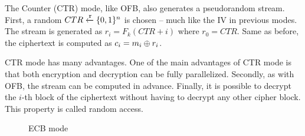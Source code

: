 \label{preliminaries:sym:modes:ctr}

The Counter (CTR) mode, like OFB, also generates a pseudorandom stream. First, a random $CTR \xleftarrow{\mathtt{r}}{\{ 0, 1 \}^{n}}$ is chosen -- much like the IV in previous modes. The stream is generated as $r_i = F_k(CTR + i)$ where $r_0 = CTR$. Same as before, the ciphertext is computed as $c_i = m_i \oplus r_i$.

CTR mode has many advantages. One of the main advantages of CTR mode is that both encryption and decryption can be fully parallelized. Secondly, as with OFB, the stream can be computed in advance. Finally, it is possible to decrypt the $i$-th block of the ciphertext without having to decrypt any other cipher block. This property is called random access.

\begin{figure}[!ht]
    \centering
  \caption{ECB mode}
  \label{fig:sym:block:ecb}
\end{figure}

